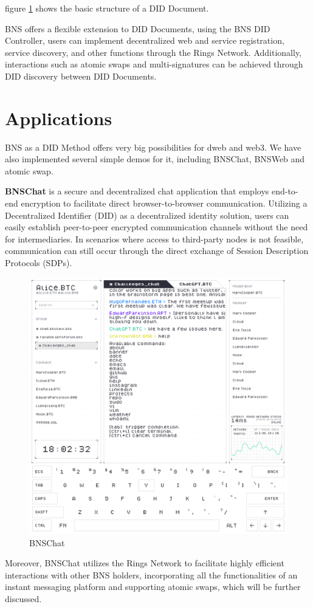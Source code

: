 \documentclass[twocolumn]{article}
\begin{document}
figure \ref{diddoc} shows the basic structure of a DID Document.

BNS offers a flexible extension to DID Documents, using the BNS DID Controller, users can implement decentralized web and service registration, service discovery, and other functions through the Rings Network. Additionally, interactions such as atomic swaps and multi-signatures can be achieved through DID discovery between DID Documents.


\section{Applications}

BNS as a DID Method offers very big possibilities for dweb and web3. We have also implemented several simple demos for it, including BNSChat, BNSWeb and atomic swap.


\textbf{BNSChat} is a secure and decentralized chat application that employs end-to-end encryption to facilitate direct browser-to-browser communication. Utilizing a Decentralized Identifier (DID) as a decentralized identity solution, users can easily establish peer-to-peer encrypted communication channels without the need for intermediaries. In scenarios where access to third-party nodes is not feasible, communication can still occur through the direct exchange of Session Description Protocols (SDPs).

\begin{figure}[htbp]
  \includegraphics[width=\linewidth]{imgs/chat.jpg}
  \caption{BNSChat}
  \label{diddoc}

\end{figure}
Moreover, BNSChat utilizes the Rings Network to facilitate highly efficient interactions with other BNS holders, incorporating all the functionalities of an instant messaging platform and supporting atomic swaps, which will be further discussed.
\end{document}
